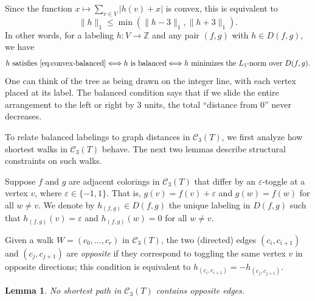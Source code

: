 \documentclass[12pt,reqno]{amsart}
\newtheorem{lem}[thm]{Lemma}
\theoremstyle{definition}
\newcommand{\C}{\mathcal{C}}
\newcommand{\Z}{\mathbb{Z}}
\begin{document}
Since the function $x\mapsto \sum_{v\in V}|h(v)+x|$ is convex, this is equivalent to 
\begin{equation}\label{eq:convex-balanced}
\|h\|_1\le \min \left(\|h-3\|_1, \|h+3\|_1\right). 
\end{equation}
In other words, for a labeling $h\colon V\to\Z$ and any pair $(f,g)$ with $h\in D(f,g)$, we have
\[
h \text{ satisfies~\eqref{eq:convex-balanced}} \Longleftrightarrow h \text{ is balanced} \Longleftrightarrow h \text{ minimizes the } L_1 \text{-norm over } D(f, g).
\]
One can think of the tree as being drawn on the integer line, with each vertex
placed at its label.  The balanced condition says that if we slide the entire
arrangement to the left or right by $3$ units, the total ``distance from $0$'' never decreases.

To relate balanced labelings to graph distances in $\C_3(T)$, we first analyze how shortest walks in $\C_3(T)$ behave. The next two lemmas describe structural constraints on such walks.

Suppose $f$ and $g$ are adjacent colorings in $\C_3(T)$ that differ by an $\varepsilon$-toggle at a vertex $v$, where $\varepsilon\in \{-1, 1\}$. That is, $g(v)=f(v)+\varepsilon$ and $g(w)=f(w)$ for all $w\neq v$. We denote by $h_{(f,g)}\in D(f,g)$ the unique labeling in $D(f, g)$ such that $h_{(f,g)}(v)=\varepsilon$ and $h_{(f,g)}(w)=0$ for all $w\neq v$. 

Given a walk $W = (c_0, \dots, c_r)$ in $\C_3(T)$, the two (directed) edges $(c_i, c_{i+1})$ and $(c_j, c_{j+1})$ are \emph{opposite} if they correspond to toggling the same vertex $v$ in opposite directions; this condition is equivalent to $h_{(c_{i}, c_{i+1})}=-h_{(c_{j}, c_{j+1})}$.

\begin{lem}\label{lem:opposite-edges}
No shortest path in $\C_3(T)$ contains opposite edges.
\end{lem}
\end{document}
